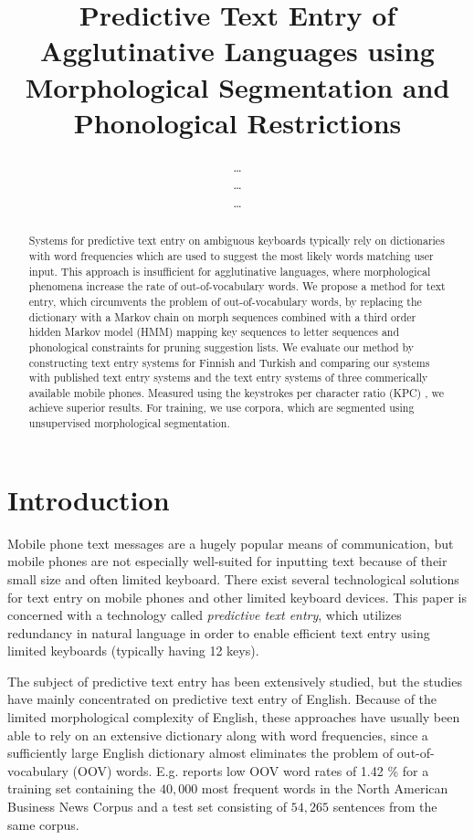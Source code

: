 \documentclass{llncs}
\begin{document}
\title{Predictive Text Entry of Agglutinative Languages using Morphological Segmentation and Phonological Restrictions}

\author{\ldots\\\ldots\\\ldots}
\institute{\ldots}

\maketitle

\begin{abstract}
Systems for predictive text entry on ambiguous keyboards typically
rely on dictionaries with word frequencies which are used to suggest
the most likely words matching user input. This approach is
insufficient for agglutinative languages, where morphological
phenomena increase the rate of out-of-vocabulary words. We propose a
method for text entry, which circumvents the problem of
out-of-vocabulary words, by replacing the dictionary with a Markov
chain on morph sequences combined with a third order hidden Markov
model (HMM) mapping key sequences to letter sequences and phonological
constraints for pruning suggestion lists. We evaluate our method by
constructing text entry systems for Finnish and Turkish and comparing
our systems with published text entry systems and the text entry systems
of three commerically available mobile phones. Measured using the
keystrokes per character ratio (KPC) \cite{MacKenzie02kspc}, we
achieve superior results. For training, we use corpora, which are
segmented using unsupervised morphological segmentation.
\end{abstract}

\section{Introduction}

Mobile phone text messages are a hugely popular means of
communication, but mobile phones are not especially well-suited for
inputting text because of their small size and often limited
keyboard. There exist several technological solutions for text entry
on mobile phones and other limited keyboard devices. This paper is
concerned with a technology called \textit{predictive text entry}, which
utilizes redundancy in natural language in order to enable efficient
text entry using limited keyboards (typically having 12 keys).

The subject of predictive text entry has been extensively studied, but
the studies have mainly concentrated on predictive text entry of
English. Because of the limited morphological complexity of English,
these approaches have usually been able to rely on an extensive
dictionary along with word frequencies, since a sufficiently large
English dictionary almost eliminates the problem of out-of-vocabulary
(OOV) words. E.g. \cite{klarlund/2002} reports low OOV word rates of
1.42 \% for a training set containing the $40,000$ most frequent words
in the North American Business News Corpus and a test set consisting
of $54,265$ sentences from the same corpus.
\end{document}
